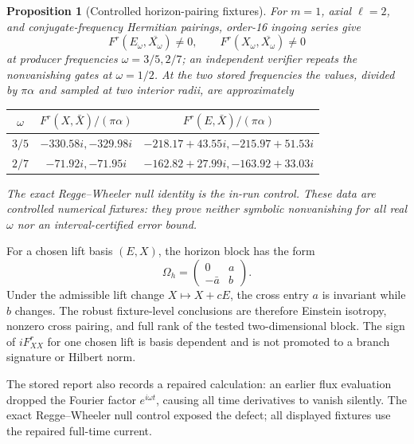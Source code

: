 \documentclass[11pt]{article}
\newtheorem{proposition}[theorem]{Proposition}
\theoremstyle{definition}
\theoremstyle{remark}
\begin{document}
\begin{proposition}[Controlled horizon-pairing fixtures]
For \(m=1\), axial \(\ell=2\), and conjugate-frequency Hermitian pairings,
order-16 ingoing series give
\begin{equation}
 F^r(E_\omega,\overline{X_\omega})\neq0,
 \qquad
 F^r(X_\omega,\overline{X_\omega})\neq0
\end{equation}
at producer frequencies \(\omega=3/5,2/7\); an independent verifier repeats
the nonvanishing gates at \(\omega=1/2\).  At the two stored frequencies the
values, divided by \(\pi\alpha\) and sampled at two interior radii, are
approximately
\begin{center}
\begin{tabular}{@{}c c c@{}}
\toprule
\(\omega\) & \(F^r(X,\bar X)/(\pi\alpha)\) &
\(F^r(E,\bar X)/(\pi\alpha)\)\\
\midrule
\(3/5\) & \(-330.58i,-329.98i\) &
\(-218.17+43.55i,-215.97+51.53i\)\\
\(2/7\) & \(-71.92i,-71.95i\) &
\(-162.82+27.99i,-163.92+33.03i\)\\
\bottomrule
\end{tabular}
\end{center}
The exact Regge--Wheeler null identity is the in-run control.  These data are
controlled numerical fixtures: they prove neither symbolic nonvanishing for
all real \(\omega\) nor an interval-certified error bound.
\end{proposition}

For a chosen lift basis \((E,X)\), the horizon block has the form
\begin{equation}
 \Omega_h=\begin{pmatrix}0&a\\-\bar a&b\end{pmatrix}.
\end{equation}
Under the admissible lift change \(X\mapsto X+cE\), the cross entry \(a\) is
invariant while \(b\) changes.  The robust fixture-level conclusions are
therefore Einstein isotropy, nonzero cross pairing, and full rank of the
tested two-dimensional block.  The sign of \(iF^r_{XX}\) for one chosen lift
is basis dependent and is not promoted to a branch signature or Hilbert
norm.

The stored report also records a repaired calculation: an earlier flux
evaluation dropped the Fourier factor \(e^{i\omega t}\), causing all time
derivatives to vanish silently.  The exact Regge--Wheeler null control exposed
the defect; all displayed fixtures use the repaired full-time current.
\end{document}

